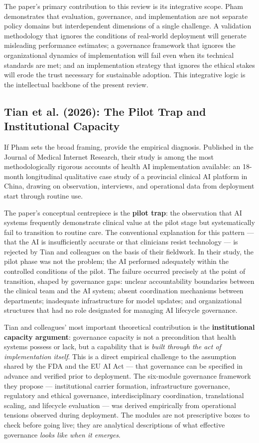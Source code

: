 The paper's primary contribution to this review is its integrative scope.
Pham demonstrates that evaluation, governance, and implementation are not
separate policy domains but interdependent dimensions of a single challenge.
A validation methodology that ignores the conditions of real-world
deployment will generate misleading performance estimates; a governance
framework that ignores the organizational dynamics of implementation will
fail even when its technical standards are met; and an implementation
strategy that ignores the ethical stakes will erode the trust necessary
for sustainable adoption. This integrative logic is the intellectual
backbone of the present review.

\subsection{Tian et al. (2026): The Pilot Trap and Institutional Capacity}
\label{sec:tian}

If Pham sets the broad framing, \citet{tian2026pilottrap} provide the
empirical diagnosis. Published in the Journal of Medical Internet Research,
their study is among the most methodologically rigorous accounts of health
AI implementation available: an 18-month longitudinal qualitative case
study of a provincial clinical AI platform in China, drawing on observation,
interviews, and operational data from deployment start through routine use.

The paper's conceptual centrepiece is the \textbf{pilot trap}: the observation
that AI systems frequently demonstrate clinical value at the pilot stage but
systematically fail to transition to routine care. The conventional explanation
for this pattern — that the AI is insufficiently accurate or that clinicians
resist technology — is rejected by Tian and colleagues on the basis of their
fieldwork. In their study, the pilot phase was not the problem; the AI
performed adequately within the controlled conditions of the pilot. The
failure occurred precisely at the point of transition, shaped by governance
gaps: unclear accountability boundaries between the clinical team and the
AI system; absent coordination mechanisms between departments; inadequate
infrastructure for model updates; and organizational structures that had
no role designated for managing AI lifecycle governance.

Tian and colleagues' most important theoretical contribution is the
\textbf{institutional capacity argument}: governance capacity is not a
precondition that health systems possess or lack, but a capability that
is \textit{built through the act of implementation itself}. This is a
direct empirical challenge to the assumption shared by the FDA and the
EU AI Act — that governance can be specified in advance and verified
prior to deployment. The six-module governance framework they propose
— institutional carrier formation, infrastructure governance, regulatory
and ethical governance, interdisciplinary coordination, translational
scaling, and lifecycle evaluation — was derived empirically from
operational tensions observed during deployment. The modules are not
prescriptive boxes to check before going live; they are analytical
descriptions of what effective governance \textit{looks like when it
emerges}.

